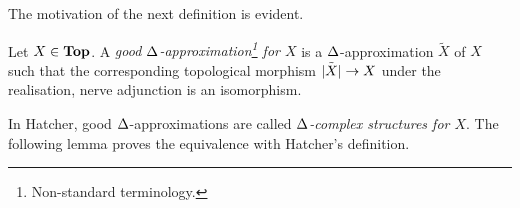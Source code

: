 \documentclass{article}
\begin{document}
\begin{rmk}
  The motivation of the next definition is evident.
\end{rmk}

\begin{dfn}
  
  Let $X \in \mathbf{Top}$.
  A \emph{good $\Delta$-approximation\footnote{
    Non-standard terminology.
  } for $X$} is a $\Delta$-approximation $\tilde{X}$ of $X$ such that 
  the corresponding topological morphism $\tilde{\left\vert X \right\vert} \to X$
  under the realisation, nerve adjunction is an isomorphism.
\end{dfn}

\begin{rmk}
  In Hatcher, good $\Delta$-approximations are called 
  \emph{$\Delta$-complex structures for $X$}.
  The following lemma proves the equivalence with Hatcher's definition.
\end{rmk}
\end{document}
